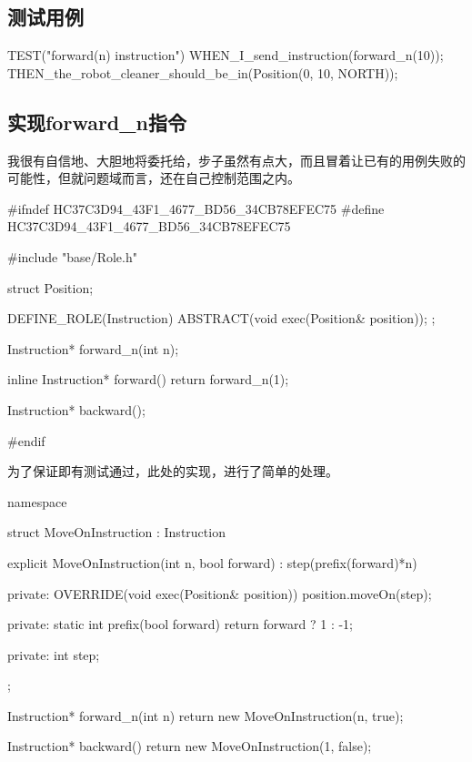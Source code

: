 \begin{content}

\subsection{测试用例}

\begin{leftbar}
\begin{c++}[caption={test/robot-cleaner/TestRobotCleaner.h}]
TEST("forward(n) instruction")
{
    WHEN_I_send_instruction(forward_n(10));
    THEN_the_robot_cleaner_should_be_in(Position(0, 10, NORTH));
}
\end{c++}
\end{leftbar}

\subsection{实现forward\_n指令}

我很有自信地、大胆地将委托给，步子虽然有点大，而且冒着让已有的用例失败的可能性，但就问题域而言，还在自己控制范围之内。

\begin{leftbar}
\begin{c++}[caption={include/robot-cleaner/Instruction.h}]
#ifndef HC37C3D94_43F1_4677_BD56_34CB78EFEC75
#define HC37C3D94_43F1_4677_BD56_34CB78EFEC75

#include "base/Role.h"

struct Position;

DEFINE_ROLE(Instruction)
{
    ABSTRACT(void exec(Position& position));
};

Instruction* forward_n(int n);

inline Instruction* forward()
{ return forward_n(1); }

Instruction* backward();

#endif
\end{c++}
\end{leftbar}

为了保证即有测试通过，此处的实现，进行了简单的处理。

\begin{leftbar}
\begin{c++}[caption={src/robot-cleaner/Instruction.cpp}]
namespace
{
    struct MoveOnInstruction : Instruction
    {
        explicit MoveOnInstruction(int n, bool forward)
          : step(prefix(forward)*n)
        {}

    private:
        OVERRIDE(void exec(Position& position))
        {
            position.moveOn(step);
        }

    private:
        static int prefix(bool forward)
        {
            return forward ? 1 : -1;
        }

    private:
        int step;
    };
}

Instruction* forward_n(int n)
{ return new MoveOnInstruction(n, true); }

Instruction* backward()
{ return new MoveOnInstruction(1, false); }
\end{c++}
\end{leftbar}

\end{content}

